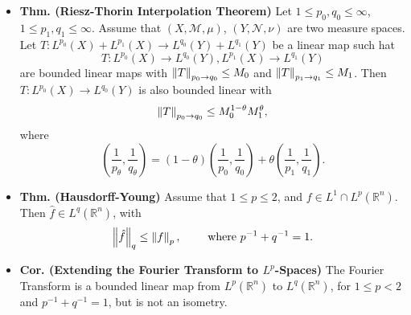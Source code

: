 \documentclass{article}
\begin{document}
\begin{itemize}
	\item \textbf{Thm. (Riesz-Thorin Interpolation Theorem)} Let $1 \leq p_{0}, q_{0} \leq \infty$, $1 \leq p_{1}, q_{1} \leq \infty$. Assume that $(X, \mathscr{M}, \mu)$, $(Y, \mathscr{N}, \nu)$ are two measure spaces. Let $T: L^{p_{0}}(X)+ L^{p_{1}}(X)\to L^{q_{0}}(Y) + L^{q_{1}}(Y)$ be a linear map such hat 
		\begin{equation}
			T: L^{p_{0}}(X) \to L^{q_{0}}(Y), L^{p_{1}}(X) \to L^{q_{1}}(Y)
		\end{equation}
	are bounded linear maps with $\left\Vert T \right\Vert_{p_{0} \to q_{0}} \leq M_{0}$ and $\left\Vert T \right\Vert_{p_{1} \to q_{1}} \leq M_{1}$. Then $T: L^{p_{0}}(X) \to L^{q_{0}}(Y)$ is also bounded linear with 
		\begin{equation}
			\left\Vert T \right\Vert_{p_{0} \to q_{0}} \leq M_{0}^{1 - \theta}M_{1}^{\theta},
		\end{equation}
	where 
		\begin{equation}
			\left(\frac{1}{p_{\theta}}, \frac{1}{q_{\theta}}\right) = (1 - \theta)\left(\frac{1}{p_{0}}, \frac{1}{q_{0}}\right) + \theta\left(\frac{1}{p_{1}}, \frac{1}{q_{1}}\right). 
		\end{equation}
		
	\item \textbf{Thm. (Hausdorff-Young)} Assume that $1 \leq p \leq 2$, and $f \in L^{1} \cap L^{p}(\mathbb{R}^{n})$. Then $\hat{f} \in L^{q}(\mathbb{R}^{n})$, with 
		\begin{equation}
			\left\Vert \hat{f} \right\Vert_{q} \leq \left\Vert f \right\Vert_{p}, \qquad \text{ where $p^{-1} + q^{-1} = 1$}.
		\end{equation}
		
	\item \textbf{Cor. (Extending the Fourier Transform to $L^{p}$-Spaces)} The Fourier Transform is a bounded linear map from $L^{p}(\mathbb{R}^{n})$ to $L^{q}(\mathbb{R}^{n})$, for $1 \leq p < 2$ and $p^{-1} + q^{-1} = 1$, but is not an isometry. 
	

\end{itemize}
\end{document}
